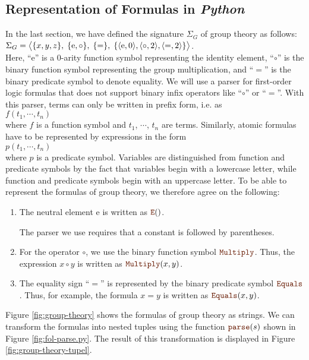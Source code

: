 \subsection{Representation of Formulas in \textsl{Python}}
In the last section, we have defined the signature $\Sigma_G$ of
group theory as follows:
\\[0.2cm]
\hspace*{1.3cm}
$\Sigma_G = 
   \bigl\langle \{x,y,z\},\; \{\mathrm{e},\circ\},\; \{=\},\; \{ \pair(\mathrm{e},0), \pair(\circ,2), \pair(=,2) \} \bigr\rangle 
$.
\\[0.2cm]
Here, ``$\mathrm{e}$'' is a 0-arity function symbol representing the identity element, ``$\circ$'' is
the binary function symbol representing the group multiplication, and ``$=$'' is the binary predicate symbol to 
denote equality. 
We will use a parser for first-order logic formulas that does not support binary infix operators like
``$\circ$'' or ``$=$''. With this parser, terms can only be written in prefix form, i.e. as
\\[0.2cm]
\hspace*{1.3cm}
$f(t_1,\cdots,t_n)$
\\[0.2cm]
where $f$ is a function symbol and $t_1$, $\cdots$, $t_n$ are terms. Similarly, atomic formulas have to be
represented by expressions in the form 
\\[0.2cm]
\hspace*{1.3cm}
$p(t_1,\cdots,t_n)$
\\[0.2cm]
where $p$ is a predicate symbol.  Variables are distinguished from function and predicate symbols
by the fact that variables begin with a lowercase letter, while function and
predicate symbols begin with an uppercase letter. To be able to represent the formulas of group theory, we
therefore agree on the following: 
\begin{enumerate}
\item The neutral element $\mathrm{e}$ is written as $\mytt{E}()$.

      The parser we use requires that  a constant is followed by parentheses.
\item For the operator $\circ$, we use the binary function symbol $\mytt{Multiply}$.
      Thus, the expression $x \circ y$ is written as $\mytt{Multiply}(x, y)$.
\item The equality sign ``$=$'' is represented by the binary predicate symbol
      $\mytt{Equals}$. Thus, for example, the formula $x = y$ is written as $\mytt{Equals}(x, y)$.
\end{enumerate}
Figure \ref{fig:group-theory} shows the formulas of group theory as strings.
We can transform the formulas into nested tuples using the function $\mytt{parse}(s)$ shown in Figure
\ref{fig:fol-parse.py}. The result of this transformation is displayed in Figure \ref{fig:group-theory-tupel}. 


